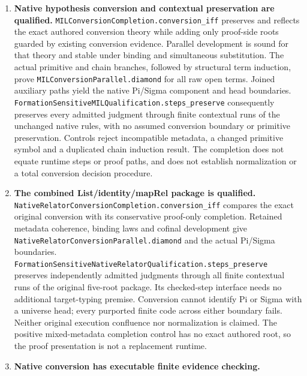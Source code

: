 \documentclass[11pt]{article}
\theoremstyle{definition}
\theoremstyle{remark}
\begin{document}
\begin{enumerate}
  \nolinkurl{Tower.piConversionBoundary} discharges refined root beta
  preservation through \nolinkurl{FormationSensitive.Typing.betaPi_tower}.
  Nonempty packages satisfying the separately constructed definitional
  expansion qualification inherit the boundary as well; arbitrary iota
  extensions and normalization remain separate.
\item \textbf{Native hypothesis conversion and contextual preservation are qualified.}
  \nolinkurl{MILConversionCompletion.conversion_iff} preserves and reflects
  the exact authored conversion theory while adding only proof-side roots
  guarded by existing conversion evidence. Parallel development is sound for
  that theory and stable under binding and simultaneous substitution.
  The actual primitive and chain branches, followed by structural term
  induction, prove \nolinkurl{MILConversionParallel.diamond} for all raw open
  terms. Joined auxiliary paths yield the native Pi/Sigma component and head
  boundaries. \nolinkurl{FormationSensitiveMILQualification.steps_preserve}
  consequently preserves every admitted judgment through finite contextual
  runs of the unchanged native rules, with no assumed conversion boundary
  or primitive preservation. Controls reject incompatible metadata, a changed
  primitive symbol and a duplicated chain induction result. The completion
  does not equate runtime steps or proof paths, and does not establish
  normalization or a total conversion decision procedure.
\item \textbf{The combined List/identity/mapRel package is qualified.}
  \nolinkurl{NativeRelatorConversionCompletion.conversion_iff} compares the
  exact original conversion with its conservative proof-only completion.
  Retained metadata coherence, binding laws and cofinal development give
  \nolinkurl{NativeRelatorConversionParallel.diamond} and the actual Pi/Sigma
  boundaries. \nolinkurl{FormationSensitiveNativeRelatorQualification.steps_preserve}
  preserves independently admitted judgments through all finite contextual
  runs of the original five-root package. Its checked-step interface needs
  no additional target-typing premise. Conversion cannot identify Pi or
  Sigma with a universe head; every purported finite code across either
  boundary fails. Neither original execution confluence nor normalization
  is claimed. The positive mixed-metadata completion control has no exact
  authored root, so the proof presentation is not a replacement runtime.
\item \textbf{Native conversion has executable finite evidence checking.}

\end{enumerate}
\end{document}
